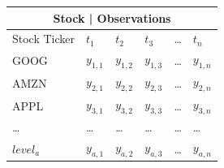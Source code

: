 \documentclass{article}
\begin{document}
    \begin{tabular}{ |p{2cm}||p{2cm}|p{2cm}|p{2cm}|p{2cm}|p{2cm}|  }
        \hline
        \multicolumn{6}{|c|}{Stock | Observations} \\
        \hline
        Stock Ticker& $t_{1}$ &$t_{2}$ & $t_{3}$ & \dots & $t_{n}$ \\
        \hline
        GOOG    &   $y_{1,1}$   &   $y_{1,2}$   &   $y_{1,3}$   &\dots &$y_{1,n}$ \\
        AMZN    &   $y_{2,1}$   &   $y_{2,2}$   &   $y_{2,3}$   &\dots &$y_{2,n}$\\
        APPL    &   $y_{3,1}$   &   $y_{3,2}$   &  $y_{3,3}$    & \dots & $y_{3,n}$\\
        \dots   &   \dots       &   \dots       &\dots  &  \dots        &\dots \\
        $level_a$    &   $y_{a,1}$   &   $y_{a,2}$   &   $y_{a,3}$   & \dots & $y_{a,n}$\\
        \hline
       \end{tabular}

    
    
\end{document}

